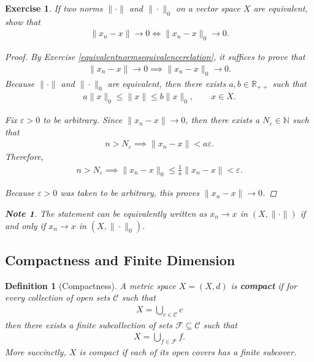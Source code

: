 \documentclass[11pt]{article}
\theoremstyle{mystyle}
\newtheorem{defn}{Definition}[section]
\newtheorem{note}{Note}[section]
\newtheorem{protoexer}{Exercise}[section]
\newenvironment{exer}
{\colorlet{shadecolor}{blue!15}\begin{shaded}\begin{protoexer}}
{\end{protoexer}\end{shaded}}
\newcommand{\0}{\mathbf{0}}
\begin{document}
\begin{exer}\label{convergentequivalentnorm}
If two norms $\|\cdot\|$ and $\|\cdot\|_0$ on a vector space $X$ are equivalent, show that 
\begin{align*}
    \|x_n -x\| \longrightarrow 0 \iff \|x_n -x\|_0 \longrightarrow 0.
\end{align*}
\begin{proof}
By Exercise \ref{equivalentnormsequivalencerelation}, it suffices to prove that
\begin{align*}
    \|x_n -x\| \longrightarrow 0 \implies \|x_n-x\|_0 \longrightarrow 0.
\end{align*}
Because $\|\cdot\|$ and $\|\cdot\|_0$ are equivalent, then there exists $a, b \in \mathbb{R}_{++}$ such that
\begin{align*}
    a \|x\|_0 \leq \|x\| \leq b\|x\|_0, \qquad x \in X.
\end{align*}

Fix $\varepsilon > 0$ to be arbitrary. Since $\|x_n -x\| \longrightarrow 0$, then there exists a $N_{\varepsilon} \in \mathbb{N}$ such that 
\begin{align*}
    n > N_{\varepsilon} \implies  \|x_n - x\| < a\varepsilon.
\end{align*}
Therefore, 
\begin{align*}
    n > N_{\varepsilon} \implies \|x_n - x\|_0 \leq \frac{1}{a}\|x_n - x\| < \varepsilon.
\end{align*}

Because $\varepsilon > 0$ was taken to be arbitrary, this proves $\|x_n - x\| \longrightarrow 0$.
\end{proof}

\begin{note}
The statement can be equivalently written as $x_n \longrightarrow x$ in $(X, \|\cdot\|)$ if and only if $x_n \longrightarrow x$ in $(X, \|\cdot\|_0)$.
\end{note}
\end{exer}

\subsection{Compactness and Finite Dimension}

\begin{defn}[Compactness]\label{compact}
A metric space $X = (X, d)$ is \textbf{compact} if for every collection of open sets $\mathcal{C}$ such that 
\begin{align*}
    X = \bigcup_{c \in \mathcal{C}} c
\end{align*}
then there exists a \textit{finite} subcollection of sets $\mathcal{F} \subseteq \mathcal{C}$ such that
\begin{align*}
    X = \bigcup_{f \in \mathcal{F}} f.
\end{align*}
More succinctly, $X$ is compact if each of its open covers has a finite subcover.
\end{defn}
\end{document}
